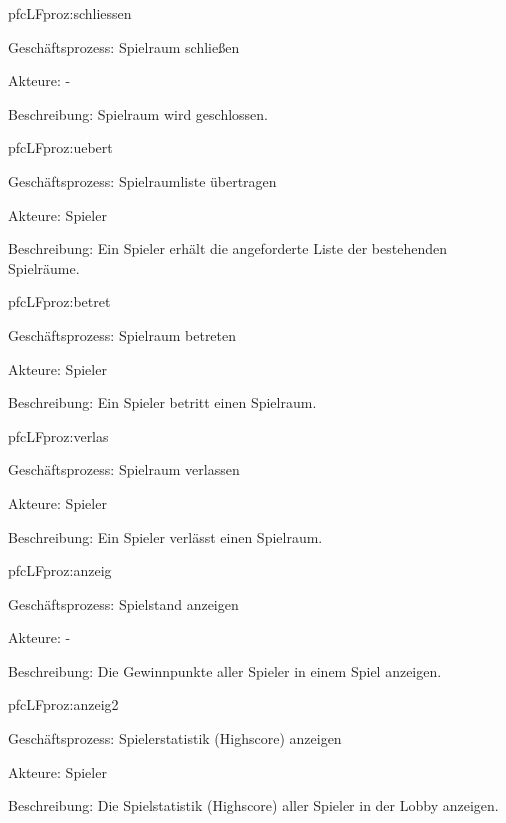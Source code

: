 \begin{description}[leftmargin=5em, style=sameline]
	\begin{lhp}{pfc}{LF}{proz:schliessen}
		\item [Geschäftsprozess:] Spielraum schließen
		\item [Akteure:] -
		\item [Beschreibung:] Spielraum wird geschlossen.
	\end{lhp}
	
	\begin{lhp}{pfc}{LF}{proz:uebert}
		\item [Geschäftsprozess:] Spielraumliste übertragen
		\item [Akteure:] Spieler
		\item [Beschreibung:] Ein Spieler erhält die angeforderte Liste der bestehenden Spielräume.
	\end{lhp}
	
	\begin{lhp}{pfc}{LF}{proz:betret}
		\item [Geschäftsprozess:] Spielraum betreten
		\item [Akteure:] Spieler
		\item [Beschreibung:] Ein Spieler betritt einen Spielraum.
	\end{lhp}
	
	\begin{lhp}{pfc}{LF}{proz:verlas}
		\item [Geschäftsprozess:] Spielraum verlassen
		\item [Akteure:] Spieler
		\item [Beschreibung:] Ein Spieler verlässt einen Spielraum.
	\end{lhp}
	
	\begin{lhp}{pfc}{LF}{proz:anzeig}
		\item [Geschäftsprozess:] Spielstand anzeigen
		\item [Akteure:] -
		\item [Beschreibung:] Die Gewinnpunkte aller Spieler in einem Spiel anzeigen.
	\end{lhp}
	
	\begin{lhp}{pfc}{LF}{proz:anzeig2}
		\item [Geschäftsprozess:] Spielerstatistik (Highscore) anzeigen
		\item [Akteure:] Spieler
		\item [Beschreibung:] Die Spielstatistik (Highscore) aller Spieler in der Lobby anzeigen.
	\end{lhp}
	

\end{description}

